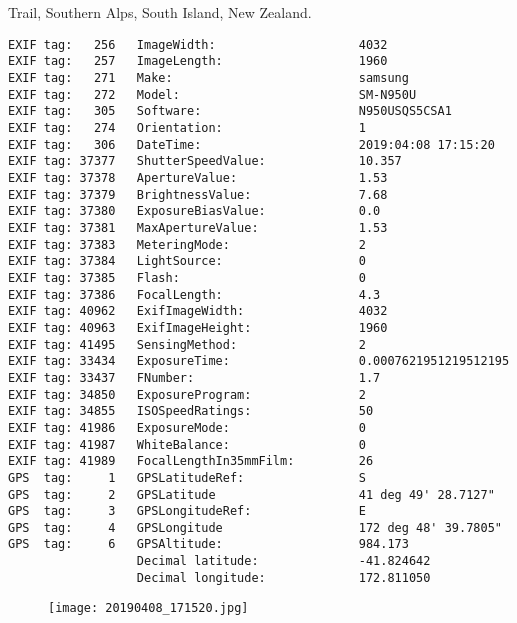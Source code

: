 \section{\protect{}}
\noindent Trail, Southern Alps, South Island, New Zealand.
\noindent
\begin{lstlisting}
EXIF tag:   256   ImageWidth:                    4032
EXIF tag:   257   ImageLength:                   1960
EXIF tag:   271   Make:                          samsung
EXIF tag:   272   Model:                         SM-N950U
EXIF tag:   305   Software:                      N950USQS5CSA1
EXIF tag:   274   Orientation:                   1
EXIF tag:   306   DateTime:                      2019:04:08 17:15:20
EXIF tag: 37377   ShutterSpeedValue:             10.357
EXIF tag: 37378   ApertureValue:                 1.53
EXIF tag: 37379   BrightnessValue:               7.68
EXIF tag: 37380   ExposureBiasValue:             0.0
EXIF tag: 37381   MaxApertureValue:              1.53
EXIF tag: 37383   MeteringMode:                  2
EXIF tag: 37384   LightSource:                   0
EXIF tag: 37385   Flash:                         0
EXIF tag: 37386   FocalLength:                   4.3
EXIF tag: 40962   ExifImageWidth:                4032
EXIF tag: 40963   ExifImageHeight:               1960
EXIF tag: 41495   SensingMethod:                 2
EXIF tag: 33434   ExposureTime:                  0.0007621951219512195
EXIF tag: 33437   FNumber:                       1.7
EXIF tag: 34850   ExposureProgram:               2
EXIF tag: 34855   ISOSpeedRatings:               50
EXIF tag: 41986   ExposureMode:                  0
EXIF tag: 41987   WhiteBalance:                  0
EXIF tag: 41989   FocalLengthIn35mmFilm:         26
GPS  tag:     1   GPSLatitudeRef:                S
GPS  tag:     2   GPSLatitude                    41 deg 49' 28.7127"
GPS  tag:     3   GPSLongitudeRef:               E
GPS  tag:     4   GPSLongitude                   172 deg 48' 39.7805"
GPS  tag:     6   GPSAltitude:                   984.173
                  Decimal latitude:              -41.824642
                  Decimal longitude:             172.811050

\end{lstlisting}
\clearpage
\begin{figure}
\raggedleft
\texttt{[image: 20190408\_171520.jpg]}
\end{figure}


\clearpage
